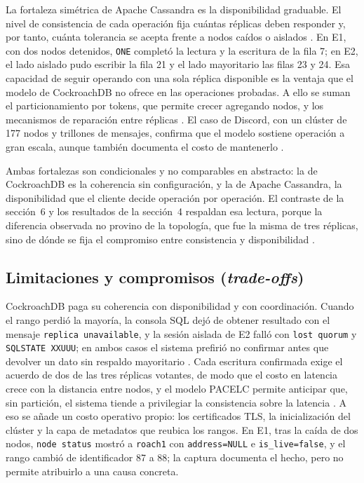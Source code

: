 \documentclass[11pt,a4paper]{article}
\newcommand{\sistemaA}{CockroachDB}      %
\newcommand{\sistemaB}{Apache Cassandra} %
\begin{document}
La fortaleza simétrica de \sistemaB{} es la disponibilidad graduable. El nivel de
consistencia de cada operación fija cuántas réplicas deben responder y, por tanto,
cuánta tolerancia se acepta frente a nodos caídos o aislados
\cite{apacheCassandraDynamo,apacheCassandraGuarantees}. En E1, con dos nodos
detenidos, \texttt{ONE} completó la lectura y la escritura de la fila 7; en E2, el
lado aislado pudo escribir la fila 21 y el lado mayoritario las filas 23 y 24. Esa
capacidad de seguir operando con una sola réplica disponible es la ventaja que el
modelo de \sistemaA{} no ofrece en las operaciones probadas. A ello se suman el
particionamiento por tokens, que permite crecer agregando nodos, y los mecanismos
de reparación entre réplicas \cite{apacheCassandraArchitecture,apacheCassandraRepair}.
El caso de Discord, con un clúster de 177 nodos y trillones de mensajes, confirma
que el modelo sostiene operación a gran escala, aunque también documenta el costo de
mantenerlo \cite{discord2023cassandra}.

Ambas fortalezas son condicionales y no comparables en abstracto: la de \sistemaA{}
es la coherencia sin configuración, y la de \sistemaB{}, la disponibilidad que el
cliente decide operación por operación. El contraste de la sección~6 y los
resultados de la sección~4 respaldan esa lectura, porque la diferencia observada no
provino de la topología, que fue la misma de tres réplicas, sino de dónde se fija
el compromiso entre consistencia y disponibilidad
\cite{cockroachlabsReplication,apacheCassandraGuarantees}.

\subsection{Limitaciones y compromisos (\emph{trade-offs})}

\sistemaA{} paga su coherencia con disponibilidad y con coordinación. Cuando el
rango perdió la mayoría, la consola SQL dejó de obtener resultado con el mensaje
\texttt{replica unavailable}, y la sesión aislada de E2 falló con \texttt{lost
quorum} y \texttt{SQLSTATE XXUUU}; en ambos casos el sistema prefirió no confirmar
antes que devolver un dato sin respaldo mayoritario
\cite{cockroachlabsReplication}. Cada escritura confirmada exige el acuerdo de dos
de las tres réplicas votantes, de modo que el costo en latencia crece con la
distancia entre nodos, y el modelo PACELC permite anticipar que, sin partición, el
sistema tiende a privilegiar la consistencia sobre la latencia
\cite{apacheCassandraDynamo}. A eso se añade un costo operativo propio: los
certificados TLS, la inicialización del clúster y la capa de metadatos que reubica
los rangos. En E1, tras la caída de dos nodos, \texttt{node status} mostró a
\texttt{roach1} con \texttt{address=NULL} e \texttt{is\_live=false}, y el rango
cambió de identificador 87 a 88; la captura documenta el hecho, pero no permite
atribuirlo a una causa concreta.
\end{document}
